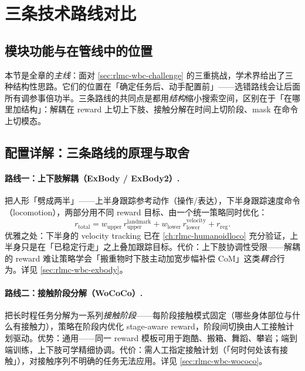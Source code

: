 \section{三条技术路线对比}\label{sec:rlmc-wbc-routes}

\subsection{模块功能与在管线中的位置}
本节是全章的\emph{主线}：面对 \cref{sec:rlmc-wbc-challenge} 的三重挑战，学术界给出了三种结构性思路。它们的位置在「确定任务后、动手配置前」——选错路线会让后面所有调参事倍功半。三条路线的共同点是都用\emph{结构}缩小搜索空间，区别在于「在哪里加结构」：解耦在 reward 上切上下肢、接触分解在时间上切阶段、mask 在命令上切模态。

\subsection{配置详解：三条路线的原理与取舍}

\paragraph{路线一：上下肢解耦（ExBody / ExBody2）.}
把人形「劈成两半」——上半身跟踪参考动作（操作/表达），下半身跟踪速度命令（locomotion），两部分用不同 reward 目标、由一个统一策略同时优化：
\begin{equation}
r_{\mathrm{total}} = w_{\mathrm{upper}}\, r_{\mathrm{upper}}^{\mathrm{landmark}} + w_{\mathrm{lower}}\, r_{\mathrm{lower}}^{\mathrm{velocity}} + r_{\mathrm{reg}}.
\label{eq:rlmc-wbc-decouple}
\end{equation}
优雅之处：下半身的 velocity tracking 已在 \cref{ch:rlmc-humanoidloco} 充分验证，上半身只是在「已稳定行走」之上叠加跟踪目标。代价：上下肢协调性受限——解耦的 reward 难让策略学会「搬重物时下肢主动加宽步幅补偿 CoM」这类\emph{耦合}行为。详见 \cref{sec:rlmc-wbc-exbody}。

\paragraph{路线二：接触阶段分解（WoCoCo）.}
把长时程任务分解为一系列\emph{接触阶段}——每阶段接触模式固定（哪些身体部位与什么有接触力），策略在阶段内优化 stage-aware reward，阶段间切换由人工接触计划驱动。优势：通用——同一 reward 模板可用于跑酷、搬箱、舞蹈、攀岩；端到端训练，上下肢可学精细协调。代价：需人工指定接触计划（「何时何处该有接触」），对接触序列不明确的任务无法应用。详见 \cref{sec:rlmc-wbc-wococo}。

